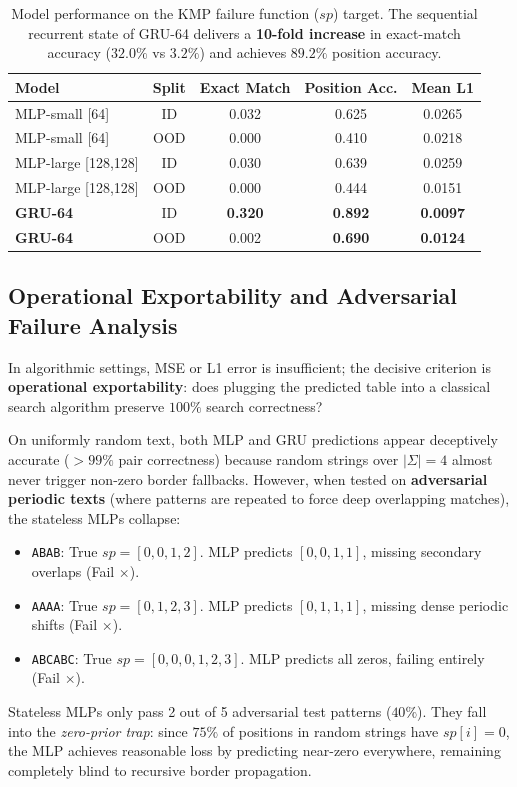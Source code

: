 \documentclass[11pt,a4paper]{article}
\newcommand{\sigmaalph}{\Sigma}
\begin{document}
\begin{table}[t]
\centering
\small
\begin{tabular}{@{}l c c c c@{}}
\toprule
Model & Split & Exact Match & Position Acc. & Mean L1 \\
\midrule
MLP-small [64] & ID & 0.032 & 0.625 & 0.0265 \\
MLP-small [64] & OOD & 0.000 & 0.410 & 0.0218 \\
MLP-large [128,128] & ID & 0.030 & 0.639 & 0.0259 \\
MLP-large [128,128] & OOD & 0.000 & 0.444 & 0.0151 \\
\textbf{GRU-64} & ID & \textbf{0.320} & \textbf{0.892} & \textbf{0.0097} \\
\textbf{GRU-64} & OOD & 0.002 & \textbf{0.690} & \textbf{0.0124} \\
\bottomrule
\end{tabular}
\caption{Model performance on the KMP failure function ($sp$) target. The sequential recurrent state of GRU-64 delivers a \textbf{10-fold increase} in exact-match accuracy ($32.0\%$ vs $3.2\%$) and achieves $89.2\%$ position accuracy.}
\label{tab:d3_sp}
\end{table}

\subsection{Operational Exportability and Adversarial Failure Analysis}
In algorithmic settings, MSE or L1 error is insufficient; the decisive criterion is \textbf{operational exportability}: does plugging the predicted table into a classical search algorithm preserve $100\%$ search correctness?

On uniformly random text, both MLP and GRU predictions appear deceptively accurate ($>99\%$ pair correctness) because random strings over $|\sigmaalph|=4$ almost never trigger non-zero border fallbacks.
However, when tested on \textbf{adversarial periodic texts} (where patterns are repeated to force deep overlapping matches), the stateless MLPs collapse:
\begin{itemize}
    \item \texttt{ABAB}: True $sp=[0,0,1,2]$. MLP predicts $[0,0,1,1]$, missing secondary overlaps (Fail $\times$).
    \item \texttt{AAAA}: True $sp=[0,1,2,3]$. MLP predicts $[0,1,1,1]$, missing dense periodic shifts (Fail $\times$).
    \item \texttt{ABCABC}: True $sp=[0,0,0,1,2,3]$. MLP predicts all zeros, failing entirely (Fail $\times$).
\end{itemize}
Stateless MLPs only pass 2 out of 5 adversarial test patterns ($40\%$). They fall into the \emph{zero-prior trap}: since $75\%$ of positions in random strings have $sp[i]=0$, the MLP achieves reasonable loss by predicting near-zero everywhere, remaining completely blind to recursive border propagation.
\end{document}

